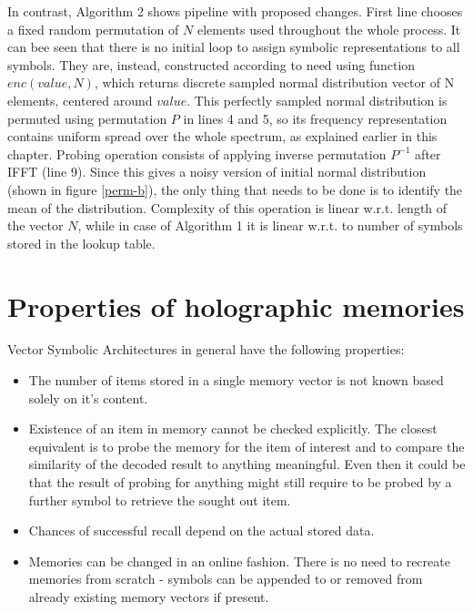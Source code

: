 \documentclass[conference]{IEEEtran}
\begin{document}
		In contrast, Algorithm 2 shows pipeline with proposed changes. First line chooses a fixed random permutation of $N$ elements used throughout the whole process. It can bee seen that there is no initial loop to assign symbolic representations to all symbols. They are, instead, constructed according to need using function $enc(value, N)$, which returns discrete sampled normal distribution vector of N elements, centered around $value$. This perfectly sampled normal distribution is permuted using permutation $P$ in lines 4 and 5, so its frequency representation contains uniform spread over the whole spectrum, as explained earlier in this chapter. Probing operation consists of applying inverse permutation $P^{-1}$ after IFFT (line 9). Since this gives a noisy version of initial normal distribution (shown in figure \ref{perm-b}), the only thing that needs to be done is to identify the mean of the distribution. Complexity of this operation is linear w.r.t. length of the vector $N$, while in case of Algorithm 1 it is linear w.r.t. to number of symbols stored in the lookup table.
		
		
	\section{Properties of holographic memories}
	
	Vector Symbolic Architectures in general have the following properties:
	\begin{itemize}
		\item The number of items stored in a single memory vector is not known based solely on it's content.
		\item Existence of an item in memory cannot be checked explicitly. The closest equivalent is to probe the memory for the item of interest and to compare the similarity of the decoded result to anything meaningful. Even then it could be that the result of probing for anything might still require to be probed by a further symbol to retrieve the sought out item.
		\item Chances of successful recall depend on the actual stored data.
		\item Memories can be changed in an online fashion. There is no need to recreate memories from scratch - symbols can be appended to or removed from already existing memory vectors if present.
	\end{itemize}
	
\end{document}
